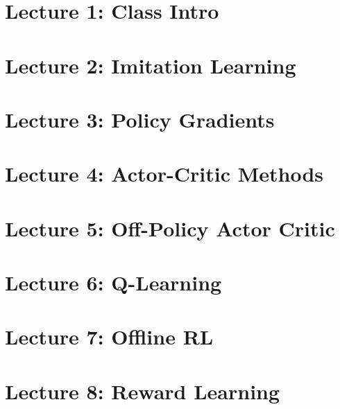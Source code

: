 \documentclass[a4paper]{article}
\begin{document}
\section{Lecture 1: Class Intro}


\section{Lecture 2: Imitation Learning}


\section{Lecture 3: Policy Gradients}


\section{Lecture 4: Actor-Critic Methods}


\section{Lecture 5: Off-Policy Actor Critic}


\section{Lecture 6: Q-Learning}


\section{Lecture 7: Offline RL}


\section{Lecture 8: Reward Learning}

\end{document}
